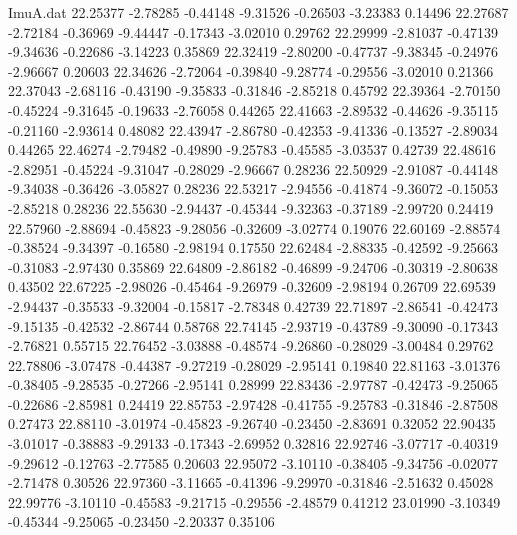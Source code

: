 \begin{filecontents}{ImuA.dat}
  22.25377   -2.78285   -0.44148   -9.31526   -0.26503   -3.23383    0.14496
  22.27687   -2.72184   -0.36969   -9.44447   -0.17343   -3.02010    0.29762
  22.29999   -2.81037   -0.47139   -9.34636   -0.22686   -3.14223    0.35869
  22.32419   -2.80200   -0.47737   -9.38345   -0.24976   -2.96667    0.20603
  22.34626   -2.72064   -0.39840   -9.28774   -0.29556   -3.02010    0.21366
  22.37043   -2.68116   -0.43190   -9.35833   -0.31846   -2.85218    0.45792
  22.39364   -2.70150   -0.45224   -9.31645   -0.19633   -2.76058    0.44265
  22.41663   -2.89532   -0.44626   -9.35115   -0.21160   -2.93614    0.48082
  22.43947   -2.86780   -0.42353   -9.41336   -0.13527   -2.89034    0.44265
  22.46274   -2.79482   -0.49890   -9.25783   -0.45585   -3.03537    0.42739
  22.48616   -2.82951   -0.45224   -9.31047   -0.28029   -2.96667    0.28236
  22.50929   -2.91087   -0.44148   -9.34038   -0.36426   -3.05827    0.28236
  22.53217   -2.94556   -0.41874   -9.36072   -0.15053   -2.85218    0.28236
  22.55630   -2.94437   -0.45344   -9.32363   -0.37189   -2.99720    0.24419
  22.57960   -2.88694   -0.45823   -9.28056   -0.32609   -3.02774    0.19076
  22.60169   -2.88574   -0.38524   -9.34397   -0.16580   -2.98194    0.17550
  22.62484   -2.88335   -0.42592   -9.25663   -0.31083   -2.97430    0.35869
  22.64809   -2.86182   -0.46899   -9.24706   -0.30319   -2.80638    0.43502
  22.67225   -2.98026   -0.45464   -9.26979   -0.32609   -2.98194    0.26709
  22.69539   -2.94437   -0.35533   -9.32004   -0.15817   -2.78348    0.42739
  22.71897   -2.86541   -0.42473   -9.15135   -0.42532   -2.86744    0.58768
  22.74145   -2.93719   -0.43789   -9.30090   -0.17343   -2.76821    0.55715
  22.76452   -3.03888   -0.48574   -9.26860   -0.28029   -3.00484    0.29762
  22.78806   -3.07478   -0.44387   -9.27219   -0.28029   -2.95141    0.19840
  22.81163   -3.01376   -0.38405   -9.28535   -0.27266   -2.95141    0.28999
  22.83436   -2.97787   -0.42473   -9.25065   -0.22686   -2.85981    0.24419
  22.85753   -2.97428   -0.41755   -9.25783   -0.31846   -2.87508    0.27473
  22.88110   -3.01974   -0.45823   -9.26740   -0.23450   -2.83691    0.32052
  22.90435   -3.01017   -0.38883   -9.29133   -0.17343   -2.69952    0.32816
  22.92746   -3.07717   -0.40319   -9.29612   -0.12763   -2.77585    0.20603
  22.95072   -3.10110   -0.38405   -9.34756   -0.02077   -2.71478    0.30526
  22.97360   -3.11665   -0.41396   -9.29970   -0.31846   -2.51632    0.45028
  22.99776   -3.10110   -0.45583   -9.21715   -0.29556   -2.48579    0.41212
  23.01990   -3.10349   -0.45344   -9.25065   -0.23450   -2.20337    0.35106

\end{filecontents}
